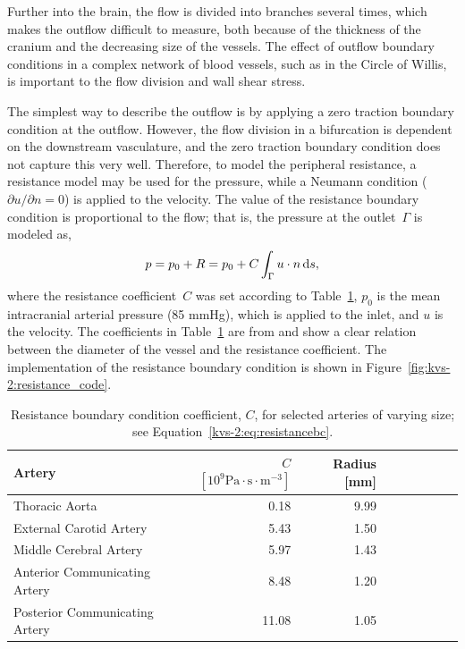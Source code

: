 Further into the brain, the flow is divided into branches several
times, which makes the outflow difficult to measure, both because of
the thickness of the cranium and the decreasing size of the vessels.
The effect of outflow boundary conditions in a complex network of
blood vessels, such as in the Circle of Willis, is important to the
flow division and wall shear stress.

The simplest way to describe the outflow is by applying a zero
traction boundary condition at the outflow. However, the flow division
in a bifurcation is dependent on the downstream vasculature, and the
zero traction boundary condition does not capture this very
well. Therefore, to model the peripheral resistance, a resistance
model may be used for the pressure, while a Neumann condition
(${\partial u / \partial n} = 0 $) is applied to the velocity. The
value of the resistance boundary condition is proportional to the
flow; that is, the pressure at the outlet~$\Gamma$ is modeled as,
\begin{equation} \label{kvs-2:eq:resistancebc}
  p = p_0 + R = p_0 + C \int_\Gamma u \cdot n \, \mathrm{d}s,
\end{equation}
where the resistance coefficient~$C$ was set according to
Table~\ref{resistance_coeff}, $p_0$ is the mean intracranial arterial
pressure (85 mmHg), which is applied to the inlet, and $u$ is the
velocity. The coefficients in Table~\ref{resistance_coeff} are
from \citet{AlastrueyParkerPeiroEtAl2007} and show a clear relation
between the diameter of the vessel and the resistance coefficient. The
implementation of the resistance boundary condition is shown in
Figure~\ref{fig:kvs-2:resistance_code}.

\begin{table}
  \centering
  \begin{tabular}{l*{7}{r}r}
    \toprule
    Artery & $C$ $ [10^9 \mathrm{Pa} \cdot \mathrm{s}  \cdot \mathrm{m}^{-3}]$ & Radius [mm]\\
    \midrule
    Thoracic Aorta			&  0.18 &  	9.99\\
    External Carotid Artery  	& 5.43   &	1.50\\
    Middle Cerebral Artery  	& 5.97   &	1.43\\
    Anterior Communicating Artery  	& 8.48   &	1.20\\
    Posterior Communicating Artery  & 11.08   &	1.05\\
    \bottomrule
  \end{tabular}
  \caption{Resistance boundary condition coefficient, $C$,
    for selected arteries of varying size; see Equation~\eqref{kvs-2:eq:resistancebc}.}
  \label{resistance_coeff}
\end{table}

